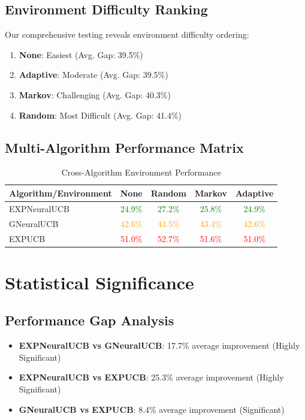 \documentclass[11pt,a4paper]{article}
\begin{document}
\subsection{Environment Difficulty Ranking}

Our comprehensive testing reveals environment difficulty ordering:
\begin{enumerate}
    \item \textbf{None}: Easiest (Avg. Gap: 39.5\%)
    \item \textbf{Adaptive}: Moderate (Avg. Gap: 39.5\%)  
    \item \textbf{Markov}: Challenging (Avg. Gap: 40.3\%)
    \item \textbf{Random}: Most Difficult (Avg. Gap: 41.4\%)
\end{enumerate}

\subsection{Multi-Algorithm Performance Matrix}

\begin{table}[H]
\centering
\caption{Cross-Algorithm Environment Performance}
\begin{tabular}{|l|c|c|c|c|}
\hline
\textbf{Algorithm/Environment} & \textbf{None} & \textbf{Random} & \textbf{Markov} & \textbf{Adaptive} \\
\hline
\hline
EXPNeuralUCB & \textcolor{green}{24.9\%} & \textcolor{green}{27.2\%} & \textcolor{green}{25.8\%} & \textcolor{green}{24.9\%} \\
GNeuralUCB & \textcolor{orange}{42.6\%} & \textcolor{orange}{44.5\%} & \textcolor{orange}{43.4\%} & \textcolor{orange}{42.6\%} \\
EXPUCB & \textcolor{red}{51.0\%} & \textcolor{red}{52.7\%} & \textcolor{red}{51.6\%} & \textcolor{red}{51.0\%} \\
\hline
\end{tabular}
\end{table}

\section{Statistical Significance}

\subsection{Performance Gap Analysis}

\begin{itemize}
    \item \textbf{EXPNeuralUCB vs GNeuralUCB}: 17.7\% average improvement (Highly Significant)
    \item \textbf{EXPNeuralUCB vs EXPUCB}: 25.3\% average improvement (Highly Significant)
    \item \textbf{GNeuralUCB vs EXPUCB}: 8.4\% average improvement (Significant)
\end{itemize}
\end{document}
